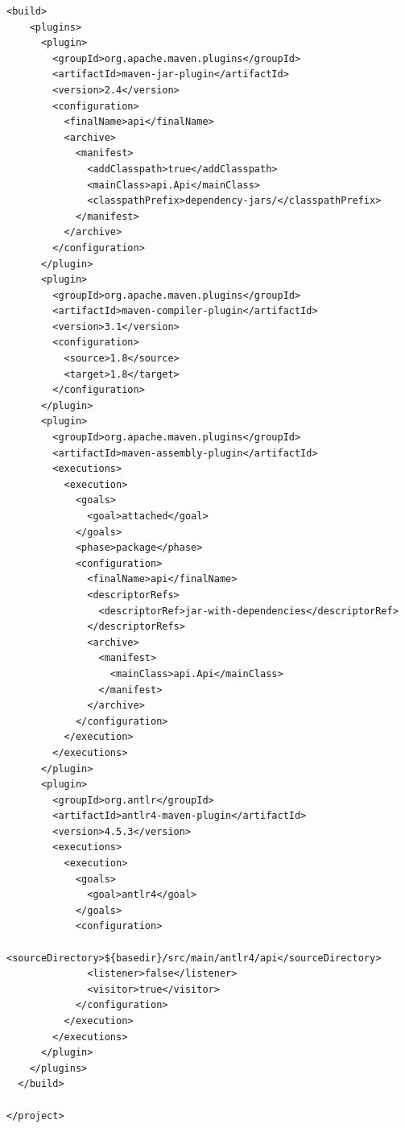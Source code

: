 \documentclass{l4proj}
\begin{document}
\begin{appendices}
\begin{lstlisting}[language=config]
  <build>
    <plugins>
      <plugin>
        <groupId>org.apache.maven.plugins</groupId>
        <artifactId>maven-jar-plugin</artifactId>
        <version>2.4</version>
        <configuration>
          <finalName>api</finalName>
          <archive>
            <manifest>
              <addClasspath>true</addClasspath>
              <mainClass>api.Api</mainClass>
              <classpathPrefix>dependency-jars/</classpathPrefix>
            </manifest>
          </archive>
        </configuration>
      </plugin>
      <plugin>
        <groupId>org.apache.maven.plugins</groupId>
        <artifactId>maven-compiler-plugin</artifactId>
        <version>3.1</version>
        <configuration>
          <source>1.8</source>
          <target>1.8</target>
        </configuration>
      </plugin>
      <plugin>
        <groupId>org.apache.maven.plugins</groupId>
        <artifactId>maven-assembly-plugin</artifactId>
        <executions>
          <execution>
            <goals>
              <goal>attached</goal>
            </goals>
            <phase>package</phase>
            <configuration>
              <finalName>api</finalName>
              <descriptorRefs>
                <descriptorRef>jar-with-dependencies</descriptorRef>
              </descriptorRefs>
              <archive>
                <manifest>
                  <mainClass>api.Api</mainClass>
                </manifest>
              </archive>
            </configuration>
          </execution>
        </executions>
      </plugin>
      <plugin>
        <groupId>org.antlr</groupId>
        <artifactId>antlr4-maven-plugin</artifactId>
        <version>4.5.3</version>
        <executions>
          <execution>
            <goals>
              <goal>antlr4</goal>
            </goals>
            <configuration>
              <sourceDirectory>${basedir}/src/main/antlr4/api</sourceDirectory>
              <listener>false</listener>
              <visitor>true</visitor>
            </configuration>
          </execution>
        </executions>
      </plugin>
    </plugins>
  </build>

</project>
\end{lstlisting}


\end{appendices}
\end{document}

